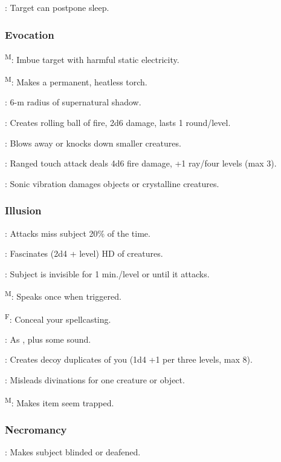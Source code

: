 	: Target can postpone sleep. %

\subsubsection{Evocation}
	\textsuperscript{M}: Imbue target with harmful static electricity. %

	\textsuperscript{M}: Makes a permanent, heatless torch.

	: 6-m radius of supernatural shadow.

	: Creates rolling ball of fire, 2d6 damage, lasts 1 round/level.

	: Blows away or knocks down smaller creatures.

	: Ranged touch attack deals 4d6 fire damage, +1 ray/four levels (max 3).

	: Sonic vibration damages objects or crystalline creatures.

\subsubsection{Illusion}
	: Attacks miss subject 20\% of the time.

	: Fascinates (2d4 + level) HD of creatures.

	: Subject is invisible for 1 min./level or until it attacks.

	\textsuperscript{M}: Speaks once when triggered.

	\textsuperscript{F}: Conceal your spellcasting. %

	: As , plus some sound.

	: Creates decoy duplicates of you (1d4 +1 per three levels, max 8).

	: Misleads divinations for one creature or object.

	\textsuperscript{M}: Makes item seem trapped.

\subsubsection{Necromancy}
	: Makes subject blinded or deafened.

